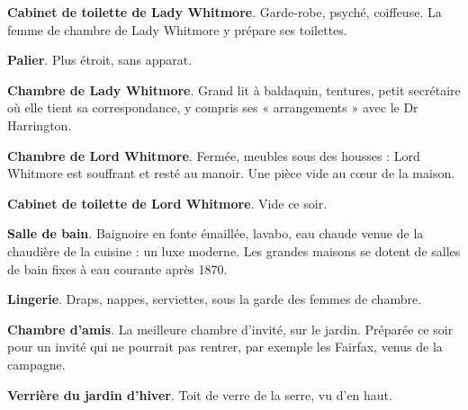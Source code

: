 \documentclass[10pt,a4paper]{article}
\begin{document}
\begin{minipage}[t]{8.75cm}
\end{minipage}\hfill\begin{minipage}[t]{8.95cm}\vspace{0pt}\fontsize{8.4}{10.2}\selectfont
\begin{descr}
\item[\textbf{D1}] \textbf{Cabinet de toilette de Lady Whitmore}. Garde-robe, psyché, coiffeuse. La femme de chambre de Lady Whitmore y prépare ses toilettes.
\item[\textbf{D2}] \textbf{Palier}. Plus étroit, sans apparat.
\item[\textbf{D5}] \textbf{Chambre de Lady Whitmore}. Grand lit à baldaquin, tentures, petit secrétaire où elle tient sa correspondance, y compris ses « arrangements » avec le Dr Harrington.
\item[\textbf{D6}] \textbf{Chambre de Lord Whitmore}. Fermée, meubles sous des housses : Lord Whitmore est souffrant et resté au manoir. Une pièce vide au cœur de la maison.
\item[\textbf{D7}] \textbf{Cabinet de toilette de Lord Whitmore}. Vide ce soir.
\item[\textbf{D8}] \textbf{Salle de bain}. Baignoire en fonte émaillée, lavabo, eau chaude venue de la chaudière de la cuisine : un luxe moderne. Les grandes maisons se dotent de salles de bain fixes à eau courante après 1870.
\item[\textbf{D11}] \textbf{Lingerie}. Draps, nappes, serviettes, sous la garde des femmes de chambre.
\item[\textbf{D12}] \textbf{Chambre d'amis}. La meilleure chambre d'invité, sur le jardin. Préparée ce soir pour un invité qui ne pourrait pas rentrer, par exemple les Fairfax, venus de la campagne.
\item[\textbf{D13}] \textbf{Verrière du jardin d'hiver}. Toit de verre de la serre, vu d'en haut.
\end{descr}
\end{minipage}
\end{document}
